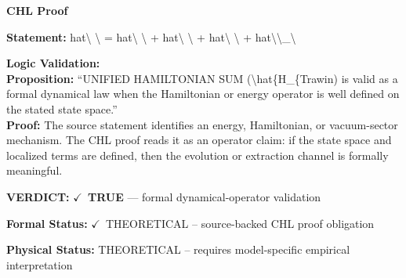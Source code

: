 \vspace{0.45em}
\noindent\textbf{CHL Proof}\par
\textbf{Statement:} hat\textbackslash{} \textbackslash{} = hat\textbackslash{} \textbackslash{} + hat\textbackslash{} \textbackslash{} + hat\textbackslash{} \textbackslash{} + hat\textbackslash{}\textbackslash{}\_\textbackslash{}

\textbf{Logic Validation:}\\
\textbf{Proposition:} ``UNIFIED HAMILTONIAN SUM (\textbackslash{}hat\{H\_\{Trawin) is valid as a formal dynamical law when the
Hamiltonian or energy operator is well defined on the stated state space.''\\
\textbf{Proof:} The source statement identifies an energy, Hamiltonian, or vacuum-sector mechanism. The
CHL proof reads it as an operator claim: if the state space and localized terms are
defined, then the evolution or extraction channel is formally meaningful.

\textbf{VERDICT:} \ensuremath{\checkmark}\ \textbf{TRUE} --- formal dynamical-operator validation

\textbf{Formal Status:} \ensuremath{\checkmark}\ THEORETICAL -- source-backed CHL proof obligation

\textbf{Physical Status:} THEORETICAL -- requires model-specific empirical interpretation
\par\vspace{0.45em}
\par
\ifTZPDarkEdition
{}
\fi
\endgroup
\endgroup
